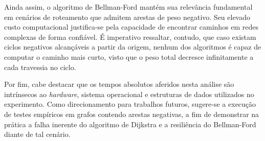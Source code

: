 \documentclass[12pt]{article}
\begin{document}
Ainda assim, o algoritmo de Bellman-Ford mantém sua relevância
fundamental em cenários de roteamento que admitem arestas de peso
negativo. Seu elevado custo computacional justifica-se pela
capacidade de encontrar caminhos em redes complexas de forma
confiável. É imperativo ressaltar, contudo, que caso existam ciclos
negativos alcançáveis a partir da origem, nenhum dos algoritmos é
capaz de computar o caminho mais curto, visto que o peso total
decresce infinitamente a cada travessia no ciclo.

Por fim, cabe destacar que os tempos absolutos aferidos nesta análise
são intrínsecos ao \textit{hardware}, sistema operacional e
estruturas de dados utilizados no experimento. Como direcionamento
para trabalhos futuros, sugere-se a execução de testes empíricos em
grafos contendo arestas negativas, a fim de demonstrar na prática a
falha inerente do algoritmo de Dijkstra e a resiliência do
Bellman-Ford diante de tal cenário.



\end{document}
